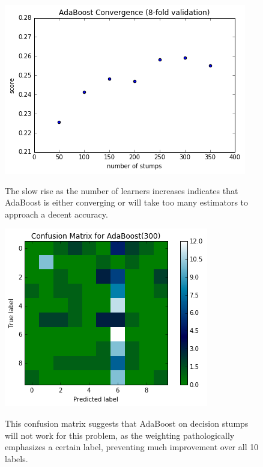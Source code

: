 \documentclass{article}
\begin{document}
\begin{figure}[H]
    \centering
    
    \begin{minipage}[b]{0.4\textwidth}
        \includegraphics[scale=0.5]{ada-convergence.png}
        \label{fig:ada-convergence}
        \caption{The slow rise as the number of learners increases indicates that AdaBoost is either converging or will take too many estimators to approach a decent accuracy.}
    \end{minipage}
    \hfill
    \begin{minipage}[b]{0.4\textwidth}
        \includegraphics[scale=0.5]{ada-confusion.png}
        \label{fig:ada-confusion}
        \caption{This confusion matrix suggests that AdaBoost on decision stumps will not
        work for this problem, as the weighting pathologically emphasizes a certain label, preventing much improvement over all 10 labels.}
    \end{minipage}
    
    \label{fig:fv33}
\end{figure}
\end{document}

